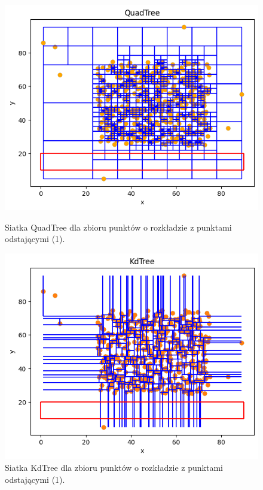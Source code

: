 \documentclass{lab}
\begin{document}
\begin{figure}[H]
  \centering
  \begin{minipage}{0.495\textwidth}
      \centering
      \includegraphics[width=1\textwidth]{resources/outlier_QuadTree_1.png}
      \caption{Siatka QuadTree dla zbioru punktów o rozkładzie z punktami odstającymi (1).}
      \label{fig:outlier_QuadTree_1}
  \end{minipage}
  \begin{minipage}{0.495\textwidth}
      \centering
      \includegraphics[width=1\textwidth]{resources/outlier_KdTree_1.png}
      \caption{Siatka KdTree dla zbioru punktów o rozkładzie z punktami odstającymi (1).}
      \label{fig:outlier_KdTree_1}
  \end{minipage}
\end{figure}
\end{document}
